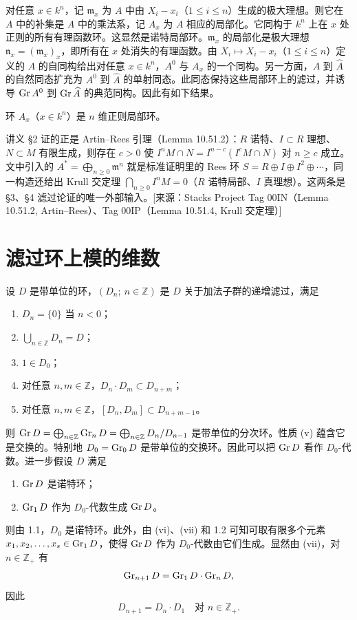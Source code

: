 对任意 $x\in k^n$，记 $\mathfrak{m}_x$ 为 $A$ 中由 $X_i-x_i$（$1\le i\le n$）生成的极大理想。则它在 $A$ 中的补集是 $A$ 中的乘法系，记 $A_x$ 为 $A$ 相应的局部化。它同构于 $k^n$ 上在 $x$ 处正则的所有有理函数环。这显然是诺特局部环。$\mathfrak{m}_x$ 的局部化是极大理想 $\mathfrak{n}_x=(\mathfrak{m}_x)_x$，即所有在 $x$ 处消失的有理函数。由 $X_i\longmapsto X_i-x_i$（$1\le i\le n$）定义的 $A$ 的自同构给出对任意 $x\in k^n$，$A^0$ 与 $A_x$ 的一个同构。另一方面，$A$ 到 $\widehat A$ 的自然同态扩充为 $A^0$ 到 $\widehat A$ 的单射同态。此同态保持这些局部环上的滤过，并诱导 $\operatorname{Gr} A^0$ 到 $\operatorname{Gr}\widehat A$ 的典范同构。因此有如下结果。

\begin{proposition}
环 $A_x$（$x\in k^n$）是 $n$ 维正则局部环。
\end{proposition}
\begin{annote}
讲义 §2 证的正是 Artin–Rees 引理（Lemma 10.51.2）：$R$ 诺特、$I\subset R$ 理想、$N\subset M$ 有限生成，则存在 $c>0$ 使 $I^nM\cap N=I^{n-c}(I^cM\cap N)$ 对 $n\ge c$ 成立。文中引入的 $A^*=\bigoplus_{n\ge 0}\mathfrak m^n$ 就是标准证明里的 Rees 环 $S=R\oplus I\oplus I^2\oplus\cdots$，同一构造还给出 Krull 交定理 $\bigcap_{n\ge0}I^nM=0$（$R$ 诺特局部、$I$ 真理想）。这两条是 §3、§4 滤过论证的唯一外部输入。[来源：Stacks Project Tag 00IN（Lemma 10.51.2, Artin–Rees）、Tag 00IP（Lemma 10.51.4, Krull 交定理）]
\end{annote}



\section{滤过环上模的维数}

设 $D$ 是带单位的环，$(D_n;\ n\in\mathbb{Z})$ 是 $D$ 关于加法子群的递增滤过，满足
\begin{enumerate}[label=(\roman*)]
  \item $D_n=\{0\}$ 当 $n<0$；
  \item $\bigcup_{n\in\mathbb{Z}}D_n=D$；
  \item $1\in D_0$；
  \item 对任意 $n,m\in\mathbb{Z}$，$D_n\cdot D_m\subset D_{n+m}$；
  \item 对任意 $n,m\in\mathbb{Z}$，$[D_n,D_m]\subset D_{n+m-1}$。
\end{enumerate}
则 $\operatorname{Gr} D=\bigoplus_{n\in\mathbb{Z}}\operatorname{Gr}_n D=\bigoplus_{n\in\mathbb{Z}}D_n/D_{n-1}$ 是带单位的分次环。性质 (v) 蕴含它是交换的。特别地 $D_0=\operatorname{Gr}_0 D$ 是带单位的交换环。因此可以把 $\operatorname{Gr} D$ 看作 $D_0$-代数。进一步假设 $D$ 满足
\begin{enumerate}[label=(\roman*),resume]
  \item $\operatorname{Gr} D$ 是诺特环；
  \item $\operatorname{Gr}_1 D$ 作为 $D_0$-代数生成 $\operatorname{Gr} D$。
\end{enumerate}
则由 1.1，$D_0$ 是诺特环。此外，由 (vi)、(vii) 和 1.2 可知可取有限多个元素 $x_1,x_2,\dots,x_s\in\operatorname{Gr}_1 D$，使得 $\operatorname{Gr} D$ 作为 $D_0$-代数由它们生成。显然由 (vii)，对 $n\in\mathbb{Z}_+$ 有
$$\operatorname{Gr}_{n+1}D=\operatorname{Gr}_1 D\cdot\operatorname{Gr}_n D,$$
因此
$$D_{n+1}=D_n\cdot D_1\quad\text{对 }n\in\mathbb{Z}_+.$$

